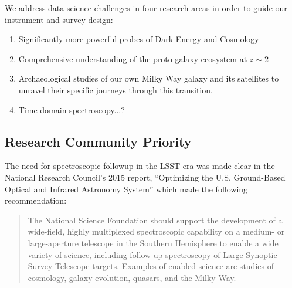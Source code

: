 \documentclass[oneside,11pt]{amsart}
\newcommand{\comment}[2][todo]{{\color{#1}[[{\bf #2}]]}}
\begin{document}
We address data science challenges in four research areas in order to guide our instrument and survey design:

\begin{enumerate}
	\item Significantly more powerful probes of Dark Energy and Cosmology
	\item Comprehensive understanding of the proto-galaxy ecosystem at $z\sim2$
	\item Archaeological studies of our own Milky Way galaxy and its satellites to unravel their specific journeys
	through this transition.
	\item Time domain spectroscopy...?
\end{enumerate}





\subsection{Research Community Priority} 
\label{sec:community}
\noindent\comment{3/4 page}



The need for spectroscopic followup in the LSST era was made clear in the National Research Council's 2015 report, ``Optimizing the U.S. Ground-Based Optical and Infrared Astronomy System'' \citep{NAP21722} which made the following recommendation:

\begin{quote}
The National Science Foundation should support the development of a wide-field, highly multiplexed spectroscopic capability on a medium- or large-aperture telescope in the Southern Hemisphere to enable a wide variety of science, including follow-up spectroscopy of Large Synoptic Survey Telescope targets. Examples of enabled science are studies of cosmology, galaxy evolution, quasars, and the Milky Way.
\end{quote}
\end{document}
